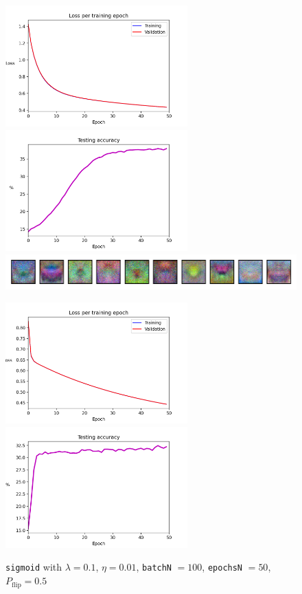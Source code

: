 \documentclass{article}
\begin{document}
\newpage
	\begin{figure}[h!]
		\centering
		\includegraphics[width=7cm]{../plots/loss_v9.png}
		\includegraphics[width=7cm]{../plots/acc_v9.png}
		\includegraphics[width=12cm]{../plots/weights_v9.png}
		\caption{\texttt{sigmoid} with $\lambda=0.1$, $\eta=0.01$, \texttt{batchN} $=100$, \texttt{epochsN} $=50$, $P_{\text{flip}}=0.5$}
		\vspace{0.2cm}
		\includegraphics[width=7cm]{../plots/loss_v10.png}
		\includegraphics[width=7cm]{../plots/acc_v10.png}

\end{figure}
\end{document}
